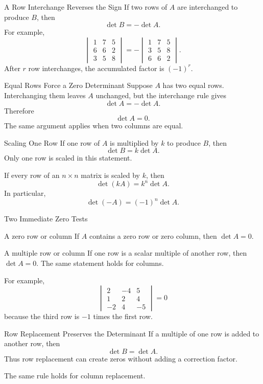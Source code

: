 \documentclass[aspectratio=169]{beamer}
\begin{document}
\begin{frame}{A Row Interchange Reverses the Sign}
If two rows of $A$ are interchanged to produce $B$, then
\[
\boxed{\det B=-\det A}.
\]
For example,
\[
\begin{vmatrix}1&7&5\\6&6&2\\3&5&8\end{vmatrix}
=-
\begin{vmatrix}1&7&5\\3&5&8\\6&6&2\end{vmatrix}.
\]
\pause
After $r$ row interchanges, the accumulated factor is $(-1)^r$.
\end{frame}

\begin{frame}{Equal Rows Force a Zero Determinant}
Suppose $A$ has two equal rows. Interchanging them leaves $A$ unchanged, but the interchange rule gives
\[
\det A=-\det A.
\]
Therefore
\[
\boxed{\det A=0}.
\]
\pause
The same argument applies when two columns are equal.
\end{frame}

\begin{frame}{Scaling One Row}
If one row of $A$ is multiplied by $k$ to produce $B$, then
\[
\boxed{\det B=k\det A}.
\]
Only one row is scaled in this statement.
\pause

If every row of an $n\times n$ matrix is scaled by $k$, then
\[
\boxed{\det(kA)=k^n\det A}.
\]
In particular,
\[
\det(-A)=(-1)^n\det A.
\]
\end{frame}

\begin{frame}{Two Immediate Zero Tests}
\begin{block}{A zero row or column}
If $A$ contains a zero row or zero column, then $\det A=0$.
\end{block}
\pause
\begin{block}{A multiple row or column}
If one row is a scalar multiple of another row, then $\det A=0$. The same statement holds for columns.
\end{block}
\pause
For example,
\[
\begin{vmatrix}2&-4&5\\1&2&4\\-2&4&-5\end{vmatrix}=0
\]
because the third row is $-1$ times the first row.
\end{frame}

\begin{frame}{Row Replacement Preserves the Determinant}
If a multiple of one row is added to another row, then
\[
\boxed{\det B=\det A}.
\]
Thus row replacement can create zeros without adding a correction factor.
\pause

The same rule holds for column replacement.
\end{frame}
\end{document}
